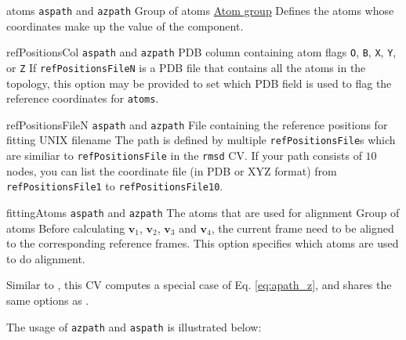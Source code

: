 \begin{cvcoptions}
\item %
  \key
    {atoms}{%
    \texttt{aspath} and \texttt{azpath}}{%
    Group of atoms}{%
    \hyperref[sec:colvar_atom_groups]{Atom group}}{%
    Defines the atoms whose coordinates make up the value of the component.}

\item %
  \key
    {refPositionsCol}{%
    \texttt{aspath} and \texttt{azpath}}{%
    PDB column containing atom flags}{%
    \texttt{O}, \texttt{B}, \texttt{X}, \texttt{Y}, or \texttt{Z}}{%
    If \texttt{refPositionsFileN} is a PDB file that contains all the atoms in the topology, this option may be provided to set which PDB field is used to flag the reference coordinates for \texttt{atoms}.}

\item %
  \key
    {refPositionsFileN}{%
    \texttt{aspath} and \texttt{azpath}}{%
    File containing the reference positions for fitting}{%
    UNIX filename}{%
		The path is defined by multiple \texttt{refPositionsFile}s which are similiar to \texttt{refPositionsFile} in the \texttt{rmsd} CV. If your path consists of $10$ nodes, you can list the coordinate file (in PDB or XYZ format) from \texttt{refPositionsFile1} to \texttt{refPositionsFile10}.
    }

\item %
  \key
    {fittingAtoms}{%
    \texttt{aspath} and \texttt{azpath}}{%
    The atoms that are used for alignment}{%
    Group of atoms}{%
		Before calculating $\mathbf{v}_1$, $\mathbf{v}_2$, $\mathbf{v}_3$ and $\mathbf{v}_4$, the current frame need to be aligned to the corresponding reference frames. This option specifies which atoms are used to do alignment.
    }

\end{cvcoptions}


Similar to , this CV computes a special case of Eq.
\ref{eq:apath_z}, and shares the same options as .

The usage of \texttt{azpath} and \texttt{aspath} is illustrated below:

